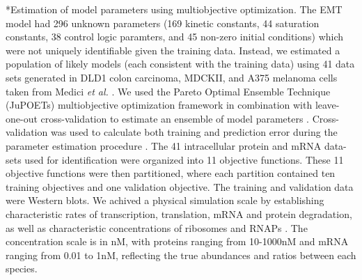 \documentclass[12pt]{article}
\makeatletter
\renewcommand\subsubsection{\@startsection
	{subsubsection}{2}{0mm}
	{-0.05in}
	{-0.5\baselineskip}
	{\normalfont\normalsize\itshape}}
\makeatother
\begin{document}
\subsubsection*{Estimation of model parameters using multiobjective optimization.}
The EMT model had 296 unknown parameters (169 kinetic constants, 44 saturation constants, 38 control logic paramters, and 45 non-zero initial conditions) which were not uniquely identifiable given the training data.
Instead, we estimated a population of likely models (each consistent with the training data)
using 41 data sets generated in DLD1 colon carcinoma, MDCKII, and A375 melanoma cells taken from Medici \emph{et al.} \citep{Medici:2008fk}.
We used the Pareto Optimal Ensemble Technique (JuPOETs) multiobjective optimization framework in combination
with leave-one-out cross-validation to estimate an ensemble of model parameters \citep{Song:2010fk}.
Cross-validation was used to calculate both training and prediction error during the parameter estimation procedure \citep{kohavi1995study}.
The 41 intracellular protein and mRNA data-sets used for identification were organized into 11 objective functions.
These 11 objective functions were then partitioned, where each partition contained ten training objectives and one validation objective.
The training and validation data were Western blots. We achived a physical simulation scale by establishing characteristic rates of transcription, translation, mRNA and protein degradation, as well as characteristic concentrations of ribosomes and RNAPs \citep{Milo:2010aa}.
The concentration scale is in nM, with proteins ranging from 10-1000nM and mRNA ranging from 0.01 to 1nM, reflecting the true abundances and ratios between each species.

\end{document}
